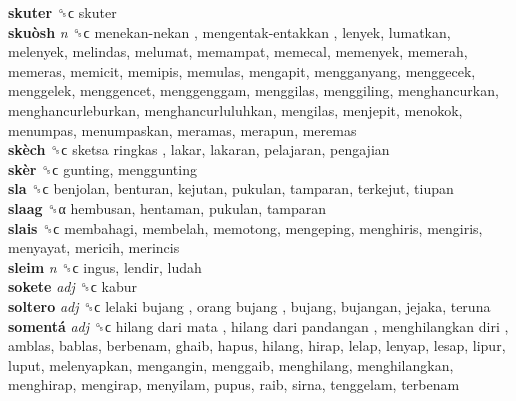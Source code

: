 \textbf{skuter} ␝ϲ  skuter  \\
\textbf{skuòsh} \emph{n}  ␝ϲ   menekan-nekan ,  mengentak-entakkan , lenyek, lumatkan, melenyek, melindas, melumat, memampat, memecal, memenyek, memerah, memeras, memicit, memipis, memulas, mengapit, mengganyang, menggecek, menggelek, menggencet, menggenggam, menggilas, menggiling, menghancurkan, menghancurleburkan, menghancurluluhkan, mengilas, menjepit, menokok, menumpas, menumpaskan, meramas, merapun, meremas  \\
\textbf{skèch} ␝ϲ   sketsa ringkas , lakar, lakaran, pelajaran, pengajian  \\
\textbf{skèr} ␝ϲ  gunting, menggunting  \\
\textbf{sla} ␝ϲ  benjolan, benturan, kejutan, pukulan, tamparan, terkejut, tiupan  \\
\textbf{slaag} ␝α  hembusan, hentaman, pukulan, tamparan  \\
\textbf{slais} ␝ϲ  membahagi, membelah, memotong, mengeping, menghiris, mengiris, menyayat, mericih, merincis  \\
\textbf{sleim} \emph{n}  ␝ϲ  ingus, lendir, ludah  \\
\textbf{sokete} \emph{adj}  ␝ϲ  kabur  \\
\textbf{soltero} \emph{adj}  ␝ϲ   lelaki bujang ,  orang bujang , bujang, bujangan, jejaka, teruna  \\
\textbf{somentá} \emph{adj}  ␝ϲ   hilang dari mata ,  hilang dari pandangan ,  menghilangkan diri , amblas, bablas, berbenam, ghaib, hapus, hilang, hirap, lelap, lenyap, lesap, lipur, luput, melenyapkan, mengangin, menggaib, menghilang, menghilangkan, menghirap, mengirap, menyilam, pupus, raib, sirna, tenggelam, terbenam  \\
